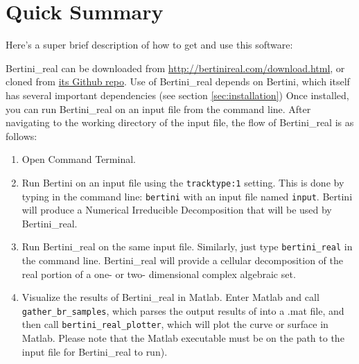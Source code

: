 \section{Quick Summary}
\label{sec:started}

Here's a super brief description of how to get and use this software:

Bertini\_real can be downloaded from \url{http://bertinireal.com/download.html}, or cloned from \href{https://github.com/ofloveandhate/bertini_real}{its Github repo}.  Use of Bertini\_real depends on Bertini, which itself has several important dependencies (see section \ref{sec:installation})
Once installed, you can run Bertini\_real on an input file from the command line. After navigating to the working directory of the input file, the flow of Bertini\_real is as follows:
\begin{enumerate}
\item Open Command Terminal. 
\item Run Bertini on an input file using the \texttt{tracktype:1} setting. This is done by typing in the command line: \texttt{bertini} with an input file named \texttt{input}. Bertini will produce a Numerical Irreducible Decomposition that will be used by Bertini\_real.
\item Run Bertini\_real on the same input file. Similarly, just type \texttt{bertini\_real} in the command line. Bertini\_real will provide a cellular decomposition of the real portion of a one- or two- dimensional complex algebraic set.
\item Visualize the results of Bertini\_real in Matlab. Enter Matlab and call \texttt{gather\_br\_samples}, which parses the output results of  into a .mat file, and then call \texttt{bertini\_real\_plotter}, which will plot the curve or surface in Matlab.  Please note that the Matlab executable must be on the path to the input file for Bertini\_real to run). 
\end{enumerate}



